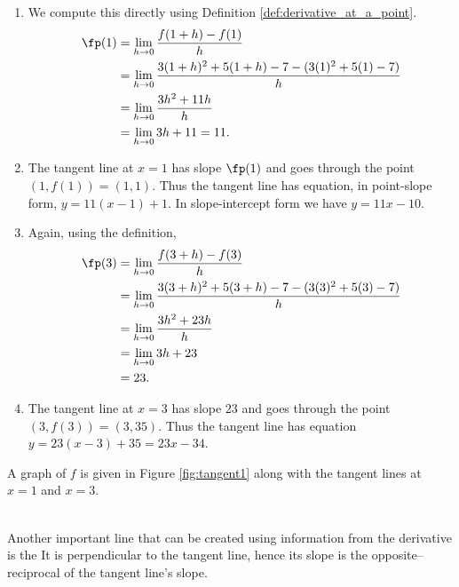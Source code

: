 {	\begin{enumerate}
	\item		We compute this directly using Definition \ref{def:derivative_at_a_point}.
					\begin{align*}
						\fp(1) &=	\lim_{h\to 0} \frac{f(1+h)-f(1)}{h} \\
										&=	\lim_{h\to 0} \frac{3(1+h)^2+5(1+h)-7 - (3(1)^2+5(1)-7)}{h}\\
										&=	\lim_{h\to 0} \frac{3h^2+11h}{h}\\
										&= 	\lim_{h\to 0}	3h+11=11.%
					\end{align*}
	\item		The tangent line at $x=1$ has slope $\fp(1)$ and goes through the point $(1,f(1)) = (1,1)$. Thus the tangent line has equation, in point-slope form, $y = 11(x-1) + 1$. In slope-intercept form we have $y = 11x-10$.
	
	\item		Again, using the definition,
					\begin{align*}
					\fp(3) &=	\lim_{h\to 0} \frac{f(3+h)-f(3)}{h} \\
									&=	\lim_{h\to 0} \frac{3(3+h)^2+5(3+h)-7 - (3(3)^2+5(3)-7)}{h} \\
									&=	\lim_{h\to 0} \frac{3h^2+23h}{h}\\
									&= \lim_{h\to 0} 3h+23 \\
									&= 23.
					\end{align*}
	
	\item		The tangent line at $x=3$ has slope $23$ and goes through the point $(3,f(3)) = (3,35)$. Thus the tangent line has equation $y=23(x-3)+35 = 23x-34$.
		\end{enumerate}


A graph of $f$ is given in Figure \ref{fig:tangent1} along with the tangent lines at $x=1$ and $x=3$.
}\\

Another important line that can be created using information from the derivative is the  It is perpendicular to the tangent line, hence its slope is the opposite--reciprocal of the tangent line's slope.

